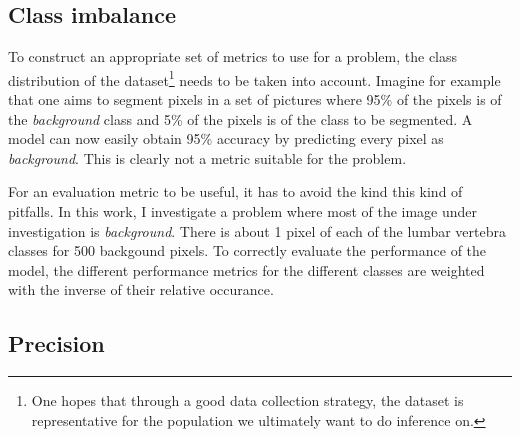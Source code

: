 \subsection{Class imbalance\label{sec:class_imbalance}}

To construct an appropriate set of metrics to use for a problem, the class distribution of the dataset\footnote{
    One hopes that through a good data collection strategy, the dataset is representative for the population we ultimately want to do inference on.

    } needs to be taken into account.
Imagine for example that one aims to segment pixels in a set of pictures where 95\% of the pixels is of the \textit{background} class and 5\% of the pixels is of the class to be segmented.
A model can now easily obtain 95\% accuracy by predicting every pixel as \textit{background}. This is clearly not a metric suitable for the problem.

For an evaluation metric to be useful, it has to avoid the kind this kind of pitfalls.
In this work, I investigate a problem where most of the image under investigation is \textit{background}. 
There is about 1 pixel of each of the lumbar vertebra classes for 500 backgound pixels.
To correctly evaluate the performance of the model, the different performance metrics for the different classes are weighted with the inverse of their relative occurance.
\newpage
\subsection{Precision}

